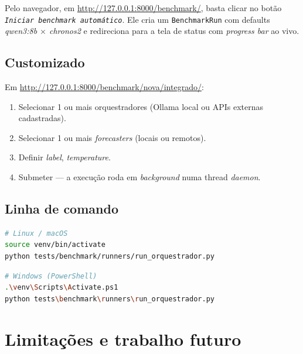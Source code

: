 \documentclass[11pt,a4paper]{article}
\newcommand{\code}[1]{\texttt{\small #1}}
\begin{document}
Pelo navegador, em \url{http://127.0.0.1:8000/benchmark/}, basta
clicar no botão \emph{\texttt{Iniciar benchmark automático}}. Ele cria
um \code{BenchmarkRun} com defaults \emph{qwen3:8b $\times$ chronos2} e
redireciona para a tela de status com \emph{progress bar} ao vivo.

\subsection{Customizado}

Em \url{http://127.0.0.1:8000/benchmark/nova/integrado/}:

\begin{enumerate}[leftmargin=*]
\item Selecionar 1 ou mais orquestradores (Ollama local ou APIs
externas cadastradas).
\item Selecionar 1 ou mais \emph{forecasters} (locais ou remotos).
\item Definir \emph{label}, \emph{temperature}.
\item Submeter --- a execução roda em \emph{background} numa thread
\emph{daemon}.
\end{enumerate}

\subsection{Linha de comando}

\begin{lstlisting}[language=bash]
# Linux / macOS
source venv/bin/activate
python tests/benchmark/runners/run_orquestrador.py
\end{lstlisting}

\begin{lstlisting}[language=bash]
# Windows (PowerShell)
.\venv\Scripts\Activate.ps1
python tests\benchmark\runners\run_orquestrador.py
\end{lstlisting}

\section{Limitações e trabalho futuro}
\end{document}
